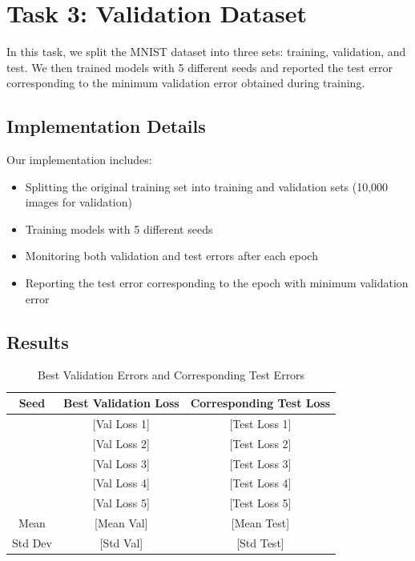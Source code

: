 \documentclass[12pt]{article}
\begin{document}
\section{Task 3: Validation Dataset}

In this task, we split the MNIST dataset into three sets: training, validation, and test. We then trained models with 5 different seeds and reported the test error corresponding to the minimum validation error obtained during training.

\subsection{Implementation Details}
Our implementation includes:
\begin{itemize}
    \item Splitting the original training set into training and validation sets (10,000 images for validation)
    \item Training models with 5 different seeds
    \item Monitoring both validation and test errors after each epoch
    \item Reporting the test error corresponding to the epoch with minimum validation error
\end{itemize}

\subsection{Results}

\begin{table}[H]
    \centering
    \caption{Best Validation Errors and Corresponding Test Errors}
    \label{tab:val_results}
    \begin{tabular}{ccc}
        \toprule
        Seed & Best Validation Loss & Corresponding Test Loss \\
        \midrule
        [Seed 1] & [Val Loss 1] & [Test Loss 1] \\
        [Seed 2] & [Val Loss 2] & [Test Loss 2] \\
        [Seed 3] & [Val Loss 3] & [Test Loss 3] \\
        [Seed 4] & [Val Loss 4] & [Test Loss 4] \\
        [Seed 5] & [Val Loss 5] & [Test Loss 5] \\
        \midrule
        Mean & [Mean Val] & [Mean Test] \\
        Std Dev & [Std Val] & [Std Test] \\
        \bottomrule
    \end{tabular}
\end{table}
\end{document}
